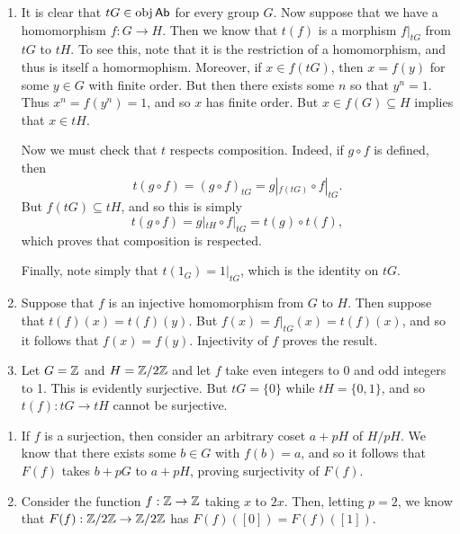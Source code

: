 \documentclass[../../solutions.tex]{subfiles}
\begin{document}
\begin{exercise} \leavevmode 
\begin{enumerate} 
\item It is clear that $tG\in\operatorname{obj}\mathsf{Ab}$ for every group $G$. Now suppose that we have a homomorphism $f:G\to H$. Then we know that $t(f)$ is a morphism $f|_{tG}$ from $tG$ to $tH$. To see this, note that it is the restriction of a homomorphism, and thus is itself a homormophism. Moreover, if $x\in f(tG)$, then $x=f(y)$ for some $y\in G$ with finite order. But then there exists some $n$ so that $y^n=1$. Thus $x^n=f(y^n)=1$, and so $x$ has finite order. But $x\in f(G)\subseteq H$ implies that $x\in tH$. 

Now we must check that $t$ respects composition. Indeed, if $g\circ f$ is defined, then \[t(g\circ f)=(g\circ f)_{tG}=g|_{f(tG)}\circ f|_{tG}.\] But $f(tG)\subseteq tH$, and so this is simply \[t(g\circ f)=g|_{tH}\circ f|_{tG}=t(g)\circ t(f),\] which proves that composition is respected. 

Finally, note simply that $t(1_G)=1|_{tG}$, which is the identity on $tG$. 

\item Suppose that $f$ is an injective homomorphism from $G$ to $H$. Then suppose that $t(f)(x)=t(f)(y)$. But $f(x)=f|_{tG}(x)=t(f)(x)$, and so it follows that $f(x)=f(y)$. Injectivity of $f$ proves the result. 

\item Let $G=\mathbb{Z}$ and $H=\mathbb{Z}/2\mathbb{Z}$ and let $f$ take even integers to 0 and odd integers to 1. This is evidently surjective. But $tG=\{0\}$ while $tH=\{0,1\}$, and so $t(f):tG\to tH$ cannot be surjective. 
\end{enumerate}
\end{exercise} 

\begin{exercise} \leavevmode 
\begin{enumerate}
\item If $f$ is a surjection, then consider an arbitrary coset $a+pH$ of $H/pH$. We know that there exists some $b\in G$ with $f(b)=a$, and so it follows that $F(f)$ takes $b+pG$ to $a+pH$, proving surjectivity of $F(f)$. 

\item Consider the function $f:\mathbb{Z}\to\mathbb{Z}$ taking $x$ to $2x$. Then, letting $p=2$, we know that $F(f):\mathbb{Z}/2\mathbb{Z}\to\mathbb{Z}/2\mathbb{Z}$ has $F(f)([0])=F(f)([1])$. 
\end{enumerate}
\end{exercise} 
\end{document}
